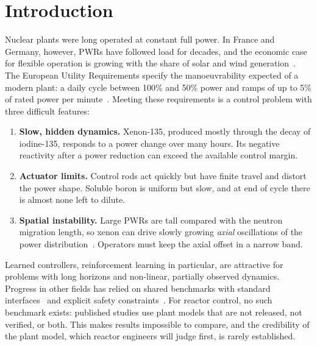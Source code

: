 \documentclass[11pt,a4paper]{article}
\begin{document}
\section{Introduction}

Nuclear plants were long operated at constant full power. In France and Germany,
however, PWRs have followed load for decades, and the economic case for flexible
operation is growing with the share of solar and wind generation~\cite{nea2011}. The
European Utility Requirements specify the manoeuvrability expected of a modern plant:
a daily cycle between 100\% and 50\% power and ramps of up to 5\% of rated power per
minute~\cite{eur}. Meeting these requirements is a control problem with three
difficult features:
\begin{enumerate}
  \item \textbf{Slow, hidden dynamics.} Xenon-135, produced mostly through the decay
  of iodine-135, responds to a power change over many hours. Its negative reactivity
  after a power reduction can exceed the available control margin.
  \item \textbf{Actuator limits.} Control rods act quickly but have finite travel and
  distort the power shape. Soluble boron is uniform but slow, and at end of cycle
  there is almost none left to dilute.
  \item \textbf{Spatial instability.} Large PWRs are tall compared with the neutron
  migration length, so xenon can drive slowly growing \emph{axial} oscillations of
  the power distribution~\cite{randall1958,stacey2018}. Operators must keep the axial
  offset in a narrow band.
\end{enumerate}

Learned controllers, reinforcement learning in particular, are attractive for problems
with long horizons and non-linear, partially observed dynamics. Progress in other
fields has relied on shared benchmarks with standard interfaces~\cite{towers2024} and
explicit safety constraints~\cite{garcia2015}. For reactor control, no such benchmark
exists: published studies use plant models that are not released, not verified, or
both. This makes results impossible to compare, and the credibility of the plant
model, which reactor engineers will judge first, is rarely established.
\end{document}
